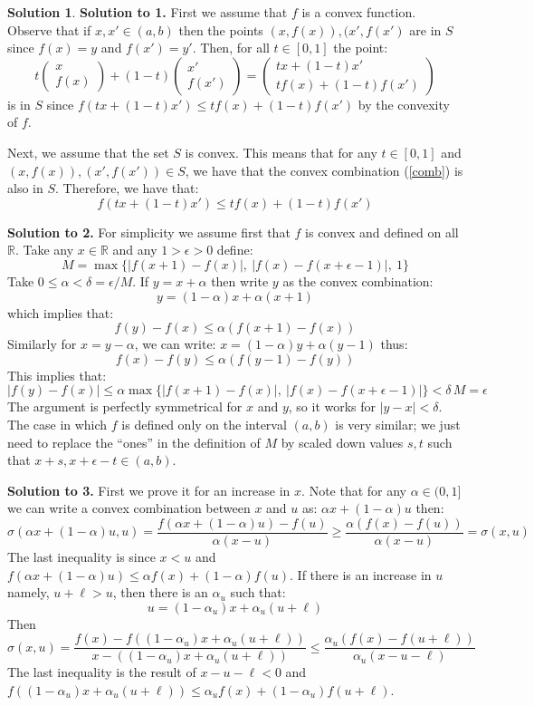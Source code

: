 \documentclass{article}
\theoremstyle{definition}
\newtheorem*{soln}{Solution}
\theoremstyle{theorem}
\newcommand{\R}{\mathbb{R}}
\newcommand{\E}{\epsilon}
\begin{document}
\begin{soln}
    \textbf{Solution to 1.} First we assume that $f$ is a convex function. Observe that if $x,x' \in (a,b)$ then the points $(x,f(x)) , (x', f(x')$ are in $S$ since $f(x)=y$ and $f(x')=y'$. Then, for all $t\in [0,1]$ the point:
    \begin{equation}\label{comb} t\begin{pmatrix}  x \\ f(x) \end{pmatrix} + (1-t)\begin{pmatrix}  x' \\ f(x') \end{pmatrix} = \begin{pmatrix}  tx + (1-t)x' \\ tf(x) + (1-t)f(x') \end{pmatrix}\end{equation}
        is in $S$ since $f(tx + (1-t)x') \leq tf(x) + (1-t) f(x')$ by the convexity of $f$.

        Next, we assume that the set $S$ is convex. This means that for any $t\in [0,1]$ and $(x,f(x)), (x',f(x')) \in S$, we have that the convex combination (\ref{comb}) is also in $S$. Therefore, we have that:
        $$f(tx + (1-t)x') \leq tf(x) + (1-t) f(x')$$

    \textbf{Solution to 2.} For simplicity we assume first that $f$ is convex and defined on all $\R$. Take any $x\in \R$  and  any $1>\epsilon >0$ define:
    $$M = \max\{|f(x+1) - f(x)|, \ |f(x) - f(x+\E- 1)|,\ 1\}$$
    Take $0\leq \alpha <\delta = \E/M$. If $y= x+\alpha$ then write  $y$ as the convex combination:
    $$y = (1-\alpha)x + \alpha(x+1)$$ which implies that:
    $$f(y) - f(x) \leq \alpha(f(x+1) - f(x))$$
    Similarly for $x= y-\alpha$,  we can write: $x= (1-\alpha)y + \alpha(y-1)$ thus:
    $$f(x) - f(y) \leq \alpha(f(y-1) - f(y) )$$
    This implies that:
    $$|f(y) -f(x) | \leq \alpha \max\{|f(x+1) - f(x)|, \ |f(x) - f(x+\E- 1)|\} < \delta \, M = \E$$
    The argument is perfectly symmetrical for $x$ and $y$, so it works for $|y-x|<\delta$. The case in which $f$ is defined only on the interval $(a,b)$ is very similar; we just need to replace the ``ones'' in the definition of $M$ by scaled down values $s,t$ such that $x+s , x+\E -t \in (a,b)$.

    \textbf{Solution to 3.} First we prove it for an increase in $x$. Note that for any $\alpha \in (0, 1]$ we can write a convex combination between $x$ and $u$ as: $\alpha x + (1-\alpha)u$ then:
    $$\sigma(\alpha x + (1-\alpha)u, u) = \frac{f(\alpha x + (1-\alpha)u) - f(u)}{\alpha(x-u)}\geq \frac{\alpha(f(x) - f(u))}{\alpha(x-u)} = \sigma(x,u)$$
    The last inequality is since $x<u$ and $f(\alpha x + (1-\alpha)u) \leq \alpha f(x) + (1-\alpha)f(u)$.
    If there is an increase in $u$ namely, $u+\ell>u$, then there is an $\alpha_u$ such that:
    $$ u = (1-\alpha_u) x+ \alpha_u(u+\ell)$$
    Then
    $$\sigma(x,u) = \frac{f(x) - f((1-\alpha_u) x+ \alpha_u(u+\ell))}{x-((1-\alpha_u) x+ \alpha_u(u+\ell))}\leq \frac{\alpha_u(f(x) - f(u+\ell))}{\alpha_u(x-u-\ell)} $$
    The last inequality is the result of $x-u-\ell<0$ and $f((1-\alpha_u) x+ \alpha_u(u+\ell))\leq \alpha_u f(x) + (1-\alpha_u)f(u+\ell)$.
    

\end{soln}
\end{document}
